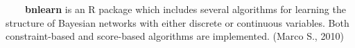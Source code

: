 ~~~~\textbf{bnlearn} is an R package which includes several algorithms for learning the structure of Bayesian networks with either discrete or continuous variables. Both constraint-based and score-based algorithms are implemented. (Marco S., 2010)